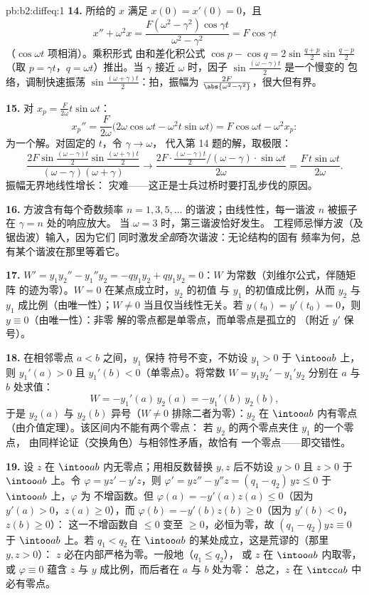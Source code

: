 \begin{solution}{pb:b2:diffeq:1}
\textbf{14.} 所给的 $x$ 满足 $x(0) = x'(0) = 0$，且
\[
x'' + \omega^2 x = \frac{F(\omega^2 -
\gamma^2)\cos\gamma t}{\omega^2 - \gamma^2} = F\cos\gamma t
\]
（$\cos\omega t$ 项相消）。乘积形式
由和差化积公式 $\cos p - \cos q = 2\sin\frac{q+p}{2}\sin\frac{q-p}2$
（取 $p = \gamma t$，$q = \omega t$）推出。当 $\gamma$ 接近
$\omega$ 时，因子 $\sin\frac{(\omega-\gamma)t}2$ 是一个慢变的
包络，调制快速振荡
$\sin\frac{(\omega+\gamma)t}2$：拍，振幅为
$\frac{2F}{\abs{\omega^2-\gamma^2}}$，很大但有界。

\textbf{15.} 对 $x_p = \frac{F}{2\omega}t\sin\omega t$：
\[
x_p'' = \frac{F}{2\omega}\bigl(2\omega\cos\omega t -
\omega^2t\sin\omega t\bigr)
= F\cos\omega t - \omega^2x_p :
\]
为一个解。对固定的 $t$，令 $\gamma \to \omega$，
代入第 14 题的解，取极限：
\[
\frac{2F\sin\frac{(\omega-\gamma)t}2
\sin\frac{(\omega+\gamma)t}{2}}
{(\omega-\gamma)(\omega+\gamma)}
\longrightarrow
\frac{2F\cdot\frac{(\omega-\gamma)t}2\big/(\omega-\gamma)
\cdot\sin\omega t}{2\omega}
= \frac{F\,t\sin\omega t}{2\omega} .
\]
振幅无界地线性增长：
灾难——这正是士兵过桥时要打乱步伐的原因。

\textbf{16.} 方波含有每个奇数频率
$n = 1, 3, 5, \dots$ 的谐波；由线性性，每一谐波
$n$ 被振子在 $\gamma = n$ 处的响应放大。
当 $\omega = 3$ 时，第三谐波恰好发生。
工程师忌惮方波（及锯齿波）输入，因为它们
同时激发\emph{全部}奇次谐波：无论结构的固有
频率为何，总有某个谐波在那里等着它。

\textbf{17.} $W' = y_1y_2'' - y_1''y_2 = -qy_1y_2 + qy_1y_2 =
0$：$W$ 为常数（刘维尔公式，伴随矩阵
的迹为零）。$W = 0$ 在某点成立时，$y_2$ 的初值
与 $y_1$ 的初值成比例，从而 $y_2$ 与
$y_1$ 成比例（由唯一性）；$W \neq 0$ 当且仅当线性无关。若 $y(t_0) =
y'(t_0) = 0$，则 $y \equiv 0$（由唯一性）：非零
解的零点都是单零点，而单零点是孤立的
（附近 $y'$ 保号）。

\textbf{18.} 在相邻零点 $a < b$ 之间，$y_1$ 保持
符号不变，不妨设 $y_1 > 0$ 于 $\intoo ab$ 上，则 $y_1'(a) > 0$ 且
$y_1'(b) < 0$（单零点）。将常数 $W =
y_1y_2' - y_1'y_2$ 分别在 $a$ 与 $b$ 处求值：
\[
W = -y_1'(a)\,y_2(a) = -y_1'(b)\,y_2(b) ,
\]
于是 $y_2(a)$ 与 $y_2(b)$ 异号（$W \neq 0$
排除二者为零）：$y_2$ 在 $\intoo ab$ 内有零点
（由介值定理）。该区间内不能有两个零点：
若 $y_2$ 的两个零点夹住 $y_1$ 的一个零点，
由同样论证（交换角色）与相邻性矛盾，故恰有
一个零点——即交错性。

\textbf{19.} 设 $z$ 在 $\intoo ab$ 内无零点；用相反数替换
$y, z$ 后不妨设 $y > 0$ 且 $z > 0$ 于
$\intoo ab$ 上。令 $\varphi = yz' - y'z$，则 $\varphi' = yz'' -
y''z = (q_1 - q_2)\,yz \leq 0$ 于 $\intoo ab$ 上，$\varphi$ 为
不增函数。但 $\varphi(a) = -y'(a)z(a) \leq 0$（因为
$y'(a) > 0$，$z(a) \geq 0$），而 $\varphi(b) = -y'(b)z(b) \geq
0$（因为 $y'(b) < 0$，$z(b) \geq 0$）：
这一不增函数自 $\leq 0$ 变至 $\geq 0$，必恒为零，故
$(q_1 - q_2)yz \equiv 0$ 于 $\intoo ab$ 上。若 $q_1 < q_2$
在 $\intoo ab$ 的某处成立，这是荒谬的（那里 $y, z > 0$）：
$z$ 必在内部严格为零。一般地（$q_1 \leq q_2$），
或 $z$ 在 $\intoo ab$ 内取零，或 $\varphi \equiv 0$
蕴含 $z$ 与 $y$ 成比例，而后者在 $a$ 与 $b$ 处为零：
总之，$z$ 在 $\intcc ab$ 中必有零点。


\end{solution}
